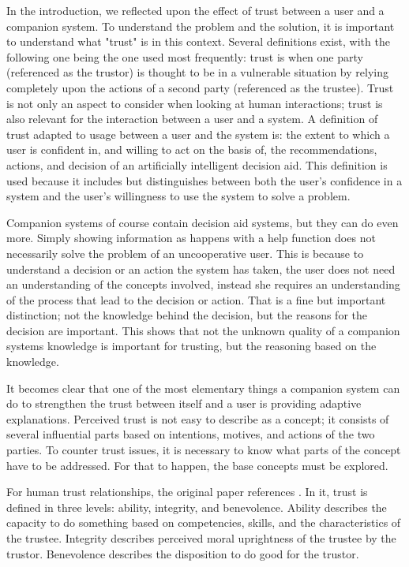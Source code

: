 \documentclass[a4paper]{article}
\begin{document}
In the introduction, we reflected upon the effect of trust between a user and a companion system. To understand the problem and the solution, it is important to understand what "trust" is in this context. Several definitions exist, with the following one being the one used most frequently: trust is when one party (referenced as the trustor) is thought to be in a vulnerable situation by relying completely upon the actions of a second party (referenced as the trustee). Trust is not only an aspect to consider when looking at human interactions; trust is also relevant for the interaction between a user and a system. A definition of trust adapted to usage between a user and the system is: the extent to which a user is confident in, and willing to act on the basis of, the recommendations, actions, and decision of an artificially intelligent decision aid\cite{htc}. This definition is used because it includes but distinguishes between both the user's confidence in a system and the user's willingness to use the system to solve a problem.

Companion systems of course contain decision aid systems, but they can do even more. Simply showing information as happens with a help function does not necessarily solve the problem of an uncooperative user. This is because to understand a decision or an action the system has taken, the user does not need an understanding of the concepts involved, instead she requires an understanding of the process that lead to the decision or action. That is a fine but important distinction; not the knowledge behind the decision, but the reasons for the decision are important. This shows that not the unknown quality of a companion systems knowledge is important for trusting, but the reasoning based on the knowledge.

It becomes clear that one of the most elementary things a companion system can do to strengthen the trust between itself and a user is providing adaptive explanations. Perceived trust is not easy to describe as a concept; it consists of several influential parts based on intentions, motives, and actions of the two parties. To counter trust issues, it is necessary to know what parts of the concept have to be addressed. For that to happen, the base concepts must be explored.

For human trust relationships, the original paper references \cite{htc}. In it, trust is defined in three levels: ability, integrity, and benevolence. Ability describes the capacity to do something based on competencies, skills, and the characteristics of the trustee. Integrity describes perceived moral uprightness of the trustee by the trustor. Benevolence describes the disposition to do good for the trustor.
\end{document}

